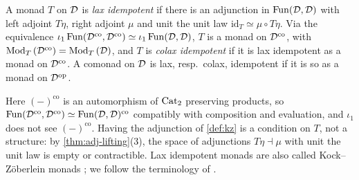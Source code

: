 \begin{defi}
\label{def:kz}
%
A monad $T$ on $\mathcal{D}$ is \emph{lax idempotent} if there is an adjunction in
$\operatorname{Fun}(\mathcal{D},\mathcal{D})$ with left adjoint $T\eta$, right adjoint $\mu$ and unit the unit
law
$\mathrm{id}_{T} \simeq \mu \circ T\eta$.
Via the equivalence
$\iota_{1}\operatorname{Fun}(\mathcal{D}^{\mathrm{co}},\mathcal{D}^{\mathrm{co}}) \simeq
\iota_{1}\operatorname{Fun}(\mathcal{D},\mathcal{D})$,
$T$ is a monad on $\mathcal{D}^{\mathrm{co}}$, with
${\operatorname{Mod}_{T}\left(\mathcal{D}^{\mathrm{co}}\right)} = {\operatorname{Mod}_{T}\left(\mathcal{D}\right)}$,
and $T$ is \emph{colax idempotent} if it is lax idempotent as a monad on
$\mathcal{D}^{\mathrm{co}}$.
A comonad on $\mathcal{D}$ is lax, resp.\ colax, idempotent if it is so as a monad on
$\mathcal{D}^{\mathrm{op}}$.
\end{defi}

%
Here $(-)^{\mathrm{co}}$ is an automorphism of $\mathrm{Cat}_{2}$ preserving products, so
$\operatorname{Fun}(\mathcal{D}^{\mathrm{co}},\mathcal{D}^{\mathrm{co}}) \simeq \operatorname{Fun}(\mathcal{D},\mathcal{D})^{\mathrm{co}}$
compatibly with composition and evaluation, and $\iota_{1}$ does not see
$(-)^{\mathrm{co}}$.
Having the adjunction of \cref{def:kz} is a condition on $T$, not a structure:
by \cref{thm:adj-lifting}(3), the space of adjunctions
$T\eta \dashv \mu$
with unit the unit law is empty or contractible.
Lax idempotent monads are also called
Kock--Z\"oberlein monads \cite{kock1995monads}; we follow the terminology of
\cite{kellylack1997propertylike}.

